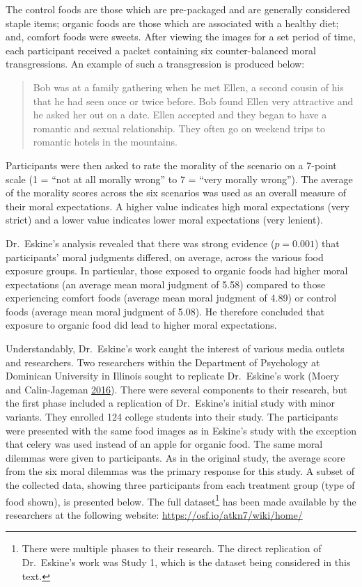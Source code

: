\documentclass[]{book}
\let\rmarkdownfootnote\footnote%
\def\footnote{\protect\rmarkdownfootnote}
\theoremstyle{plain}
\theoremstyle{mydefn}
\theoremstyle{myexmpl}
\theoremstyle{remark}
\begin{document}
The control foods are those which are pre-packaged and are generally
considered staple items; organic foods are those which are associated
with a healthy diet; and, comfort foods were sweets. After viewing the
images for a set period of time, each participant received a packet
containing six counter-balanced moral transgressions. An example of such
a transgression is produced below:

\begin{quote}
Bob was at a family gathering when he met Ellen, a second cousin of his
that he had seen once or twice before. Bob found Ellen very attractive
and he asked her out on a date. Ellen accepted and they began to have a
romantic and sexual relationship. They often go on weekend trips to
romantic hotels in the mountains.
\end{quote}

Participants were then asked to rate the morality of the scenario on a
7-point scale (1 = ``not at all morally wrong'' to 7 = ``very morally
wrong''). The average of the morality scores across the six scenarios
was used as an overall measure of their moral expectations. A higher
value indicates high moral expectations (very strict) and a lower value
indicates lower moral expectations (very lenient).

Dr.~Eskine's analysis revealed that there was strong evidence
(\(p = 0.001\)) that participants' moral judgments differed, on average,
across the various food exposure groups. In particular, those exposed to
organic foods had higher moral expectations (an average mean moral
judgment of 5.58) compared to those experiencing comfort foods (average
mean moral judgment of 4.89) or control foods (average mean moral
judgment of 5.08). He therefore concluded that exposure to organic food
did lead to higher moral expectations.

Understandably, Dr.~Eskine's work caught the interest of various media
outlets and researchers. Two researchers within the Department of
Psychology at Dominican University in Illinois sought to replicate
Dr.~Eskine's work (Moery and Calin-Jageman
\protect\hyperlink{ref-Moery2016}{2016}). There were several components
to their research, but the first phase included a replication of
Dr.~Eskine's initial study with minor variants. They enrolled 124
college students into their study. The participants were presented with
the same food images as in Eskine's study with the exception that celery
was used instead of an apple for organic food. The same moral dilemmas
were given to participants. As in the original study, the average score
from the six moral dilemmas was the primary response for this study. A
subset of the collected data, showing three participants from each
treatment group (type of food shown), is presented below. The full
dataset\footnote{There were multiple phases to their research. The
  direct replication of Dr.~Eskine's work was Study 1, which is the
  dataset being considered in this text.} has been made available by the
researchers at the following website:
\url{https://osf.io/atkn7/wiki/home/}
\end{document}
